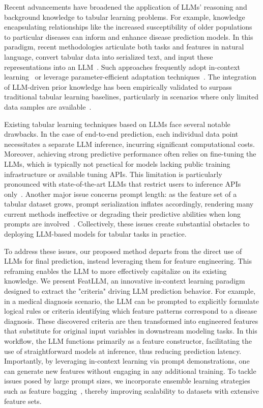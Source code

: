 Recent advancements have broadened the application of LLMs’ reasoning and background knowledge to tabular learning problems. For example, knowledge encapsulating relationships like the increased susceptibility of older populations to particular diseases can inform and enhance disease prediction models. In this paradigm, recent methodologies articulate both tasks and features in natural language, convert tabular data into serialized text, and input these representations into an LLM~\cite{dinh2022lift,wang2023anypredict}. Such approaches frequently adopt in-context learning~\cite{nam2023semi} or leverage parameter-efficient adaptation techniques~\cite{dinh2022lift,hegselmann2023tabllm}. The integration of LLM-driven prior knowledge has been empirically validated to surpass traditional tabular learning baselines, particularly in scenarios where only limited data samples are available~\cite{hegselmann2023tabllm}.

Existing tabular learning techniques based on LLMs face several notable drawbacks. In the case of end-to-end prediction, each individual data point necessitates a separate LLM inference, incurring significant computational costs. Moreover, achieving strong predictive performance often relies on fine-tuning the LLMs, which is typically not practical for models lacking public training infrastructure or available tuning APIs. This limitation is particularly pronounced with state-of-the-art LLMs that restrict users to inference APIs only~\cite{anil2023palm,openai2023gpt4}. Another major issue concerns prompt length: as the feature set of a tabular dataset grows, prompt serialization inflates accordingly, rendering many current methods ineffective or degrading their predictive abilities when long prompts are involved~\cite{liu2023lost}. Collectively, these issues create substantial obstacles to deploying LLM-based models for tabular tasks in practice.

To address these issues, our proposed method departs from the direct use of LLMs for final prediction, instead leveraging them for feature engineering. This reframing enables the LLM to more effectively capitalize on its existing knowledge. We present \textsf{FeatLLM}, an innovative in-context learning paradigm designed to extract the "criteria" driving LLM prediction behavior. For example, in a medical diagnosis scenario, the LLM can be prompted to explicitly formulate logical rules or criteria identifying which feature patterns correspond to a disease diagnosis. These discovered criteria are then transformed into engineered features that substitute for original input variables in downstream modeling tasks. In this workflow, the LLM functions primarily as a feature constructor, facilitating the use of straightforward models at inference, thus reducing prediction latency. Importantly, by leveraging in-context learning via prompt demonstrations, one can generate new features without engaging in any additional training. To tackle issues posed by large prompt sizes, we incorporate ensemble learning strategies such as feature bagging~\cite{breiman2001random}, thereby improving scalability to datasets with extensive feature sets.

